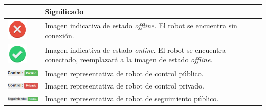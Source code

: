 \begin{table}[H]
  \begin{center}
    \begin{tabular}{|p{3.5cm}|p{10cm}|}
      \hline
      \centering{ \textbf{Elemento}} & \qquad \quad \textbf{Significado} \\
      \hline
      \vspace*{0.1cm}
      \hspace*{1.1cm}
      \includegraphics[width=1cm]{imagenes/manual-usuario/offline.png} & Imagen indicativa de estado \emph{offline}. El robot se encuentra sin conexión. \\
      \hline
      \vspace*{0.1cm}
      \hspace*{1.1cm}
      \includegraphics[width=1cm]{imagenes/manual-usuario/online.png} & Imagen indicativa de estado \emph{online}. El robot se encuentra conectado, reemplazará a la imagen de estado \emph{offline}. \\
      \hline
      \vspace*{0.1cm}
      \hspace*{0.6cm} 
      \includegraphics[width=2.2cm]{imagenes/manual-usuario/control-publico.png} &  Imagen representativa de robot de control público. \\
      \hline
      \vspace*{0.1cm}
      \hspace*{0.6cm}
      \includegraphics[width=2.2cm]{imagenes/manual-usuario/control-privado.png} &  Imagen representativa de robot de control privado. \\
      \hline
      \vspace*{0.1cm}
      \hspace*{0.4cm}
      \includegraphics[width=2.8cm]{imagenes/manual-usuario/seguimiento-publico.png} &  Imagen representativa de robot de seguimiento público. \\

\end{tabular}
\end{center}
\end{table}
